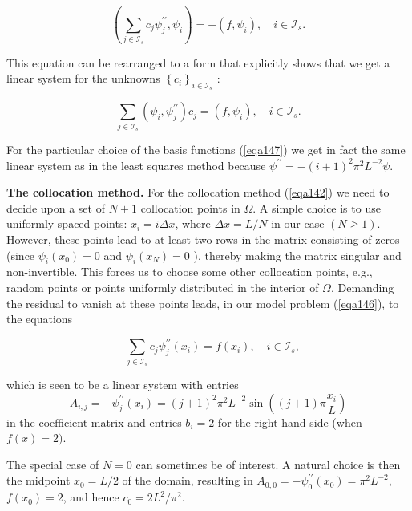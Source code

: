 \documentclass[../main.tex]{subfiles}
\begin{document}
	\begin{equation}
		\label{eqa158}
		\left(\sum_{j \in \mathcal{I}_{s}} c_{j} \psi_{j}^{\prime \prime}, \psi_{i}\right)=-\left(f, \psi_{i}\right), \quad i \in \mathcal{I}_{s} .
	\end{equation}

	\noindent This equation can be rearranged to a form that explicitly shows that we get a linear system for the unknowns $\left\{c_{i}\right\}_{i \in \mathcal{I}_{s}}$ :

	\begin{equation}
		\label{eqa159}
		\sum_{j \in \mathcal{I}_{s}}\left(\psi_{i}, \psi_{j}^{\prime \prime}\right) c_{j}=\left(f, 	\psi_{i}\right), \quad i \in \mathcal{I}_{s} .
	\end{equation}
	
	\noindent For the particular choice of the basis functions (\ref{eqa147}) we get in fact the same linear system as in the least squares method because $\psi^{\prime \prime}=-(i+1)^{2} \pi^{2} L^{-2} \psi$.\bigbreak
	
	\noindent \textbf{The collocation method.   } For the collocation method (\ref{eqa142}) we need to decide upon a set of $N+1$ collocation points in $\Omega$. A simple choice is to use uniformly spaced points: $x_{i}=i \Delta x$, where $\Delta x=L / N$ in our case $(N \geq 1)$. However, these points lead to at least two rows in the matrix consisting of zeros (since $\psi_{i}\left(x_{0}\right)=0$ and $\psi_{i}\left(x_{N}\right)=0$ ), thereby making the matrix singular and non-invertible. This forces us to choose some other collocation points, e.g., random points or points uniformly distributed in the interior of $\Omega$. Demanding the residual to vanish at these points leads, in our model problem (\ref{eqa146}), to the equations
		
	\begin{equation}
		\label{eqa160}
		-\sum_{j \in \mathcal{I}_{s}} c_{j} \psi_{j}^{\prime \prime}\left(x_{i}\right)=f\left(x_{i}\right), \quad i \in \mathcal{I}_{s},
	\end{equation}

	\noindent which is seen to be a linear system with entries
	$$ A_{i, j}=-\psi_{j}^{\prime \prime}\left(x_{i}\right)=(j+1)^{2} \pi^{2} L^{-2} \sin \left((j+1) \pi \frac{x_{i}}{L}\right) $$
	in the coefficient matrix and entries $b_{i}=2$ for the right-hand side (when $f(x)=2)$.
	
	The special case of $N=0$ can sometimes be of interest. A natural choice is then the midpoint $x_{0}=L / 2$ of the domain, resulting in $A_{0,0}=-\psi_{0}^{\prime \prime}\left(x_{0}\right)=\pi^{2} L^{-2}$, $f\left(x_{0}\right)=2$, and hence $c_{0}=2 L^{2} / \pi^{2} .$ \bigbreak
	
\end{document}
